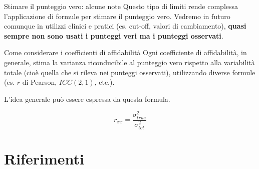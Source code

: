 \documentclass[
  ignorenonframetext,
  aspectratio=169,
]{beamer}
\begin{document}
\begin{frame}{Stimare il punteggio vero: alcune note}
\label{stimare-il-punteggio-vero-alcune-note-1}
Questo tipo di limiti rende complessa l'applicazione di formule per
stimare il punteggio vero. Vedremo in futuro comunque in utilizzi
clinici e pratici (es. cut-off, valori di cambiamento), \textbf{quasi
sempre non sono usati i punteggi veri ma i punteggi osservati}.
\end{frame}

\begin{frame}{Come considerare i coefficienti di affidabilità}
\label{come-considerare-i-coefficienti-di-affidabilituxe0}
Ogni coefficiente di affidabilità, in generale, stima la varianza
riconducibile al punteggio vero rispetto alla variabilità totale (cioè
quella che si rileva nei punteggi osservati), utilizzando diverse
formule (es. \(r\) di Pearson, \(ICC(2,1)\), etc.).

L'idea generale può essere espressa da questa formula.

\[
r_{xx} = \frac{\sigma^2_{true}}{\sigma^2_{tot}}
\]
\end{frame}

\section{Riferimenti}\label{riferimenti}
\end{document}

